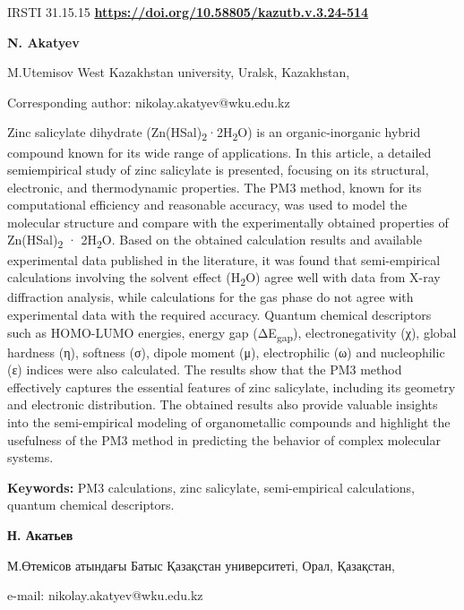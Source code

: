 \newpage
IRSTI 31.15.15
\hfill {\bfseries \href{https://doi.org/10.58805/kazutb.v.3.24-514}{https://doi.org/10.58805/kazutb.v.3.24-514}}


\begin{center}
{\bfseries N. Akatyev}

M.Utemisov West Kazakhstan university, Uralsk, Kazakhstan,

Corresponding author: nikolay.akatyev@wku.edu.kz
\end{center}

Zinc salicylate dihydrate
(Zn(HSal)\textsubscript{2}·2H\textsubscript{2}O) is an organic-inorganic
hybrid compound known for its wide range of applications. In this
article, a detailed semiempirical study of zinc salicylate is presented,
focusing on its structural, electronic, and thermodynamic properties.
The PM3 method, known for its computational efficiency and reasonable
accuracy, was used to model the molecular structure and compare with the
experimentally obtained properties of
Zn(HSal)\textsubscript{2} · 2H\textsubscript{2}O. Based on the obtained
calculation results and available experimental data published in the
literature, it was found that semi-empirical calculations involving the
solvent effect (H\textsubscript{2}O) agree well with data from X-ray
diffraction analysis, while calculations for the gas phase do not agree
with experimental data with the required accuracy. Quantum chemical
descriptors such as HOMO-LUMO energies, energy gap
(ΔE\textsubscript{gap}), electronegativity (χ), global hardness (η),
softness (σ), dipole moment (μ), electrophilic (ω) and nucleophilic (ε)
indices were also calculated. The results show that the PM3 method
effectively captures the essential features of zinc salicylate,
including its geometry and electronic distribution. The obtained results
also provide valuable insights into the semi-empirical modeling of
organometallic compounds and highlight the usefulness of the PM3 method
in predicting the behavior of complex molecular systems.

{\bfseries Keywords:} PM3 calculations, zinc salicylate, semi-empirical
calculations, quantum chemical descriptors.


\begin{center}
{\bfseries Н. Акатьев}

М.Өтемісов атындағы Батыс Қазақстан университеті, Орал, Қазақстан,

e-mail: nikolay.akatyev@wku.edu.kz
\end{center}

